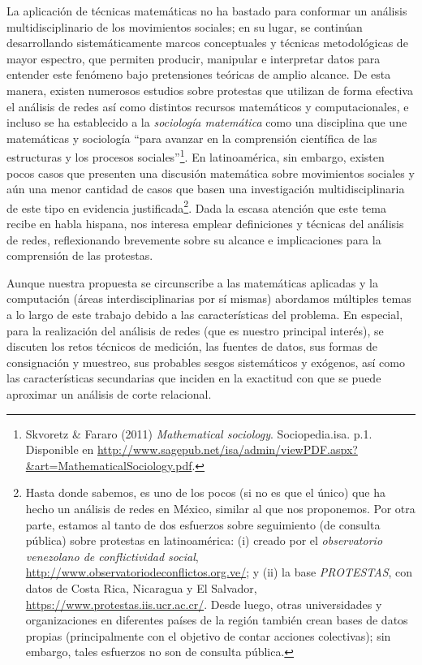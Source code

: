 \documentclass[letterpaper, 11pt]{book}
\theoremstyle{definition}
\theoremstyle{remark}
\begin{document}
La aplicación de técnicas matemáticas no ha bastado para conformar un análisis multidisciplinario de los movimientos sociales; en su lugar, se continúan desarrollando sistemáticamente marcos conceptuales y técnicas metodológicas de mayor espectro, que permiten producir, manipular e interpretar datos para entender este fenómeno bajo pretensiones teóricas de amplio alcance. 
De esta manera, existen numerosos estudios sobre protestas que utilizan de forma efectiva el análisis de redes así como distintos recursos matemáticos y computacionales, e incluso se ha establecido a la \emph{sociología matemática} como una disciplina que une matemáticas y sociología ``para avanzar en la comprensión científica de las estructuras y los procesos sociales''\footnote{
    Skvoretz \& Fararo (2011) \emph{Mathematical sociology}. Sociopedia.isa. p.1. Disponible en \url{http://www.sagepub.net/isa/admin/viewPDF.aspx?&art=MathematicalSociology.pdf}.
    }. 
En latinoamérica, sin embargo, existen pocos casos que presenten una discusión matemática sobre movimientos sociales y aún una menor cantidad de casos que basen una investigación multidisciplinaria de este tipo en evidencia justificada\footnote{
    Hasta donde sabemos, \citet{2003_Wada_Tesis} es uno de los pocos (si no es que el único) que ha hecho un análisis de redes en México, similar al que nos proponemos. 
    Por otra parte, estamos al tanto de dos esfuerzos sobre seguimiento (de consulta pública) sobre protestas en latinoamérica: 
    (i) creado por el \emph{observatorio venezolano de conflictividad social}, \url{http://www.observatoriodeconflictos.org.ve/}; 
    y (ii) la base \emph{PROTESTAS}, con datos de Costa Rica, Nicaragua y El Salvador, \url{https://www.protestas.iis.ucr.ac.cr/}. 
    Desde luego, otras universidades y organizaciones en diferentes países de la región también crean bases de datos propias (principalmente con el objetivo de contar acciones colectivas); sin embargo, tales esfuerzos no son de consulta pública. 
}. 
Dada la escasa atención que este tema recibe en habla hispana, nos interesa emplear definiciones y técnicas del análisis de redes, reflexionando brevemente sobre su alcance e implicaciones para la comprensión de las protestas. 

Aunque nuestra propuesta se circunscribe a las matemáticas aplicadas y la computación (áreas interdisciplinarias por sí mismas) abordamos múltiples temas a lo largo de este trabajo debido a las características del problema. 
En especial, para la realización del análisis de redes (que es nuestro principal interés), se discuten los retos técnicos de medición, las fuentes de datos, sus formas de consignación y muestreo, sus probables sesgos sistemáticos y exógenos, así como las características secundarias que inciden en la exactitud con que se puede aproximar un análisis de corte relacional. 
\end{document}
